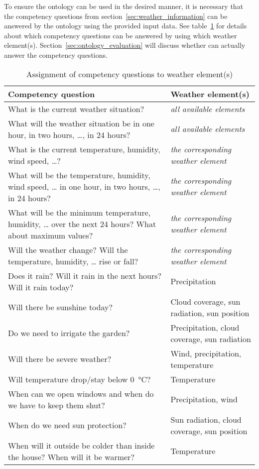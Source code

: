 To ensure the ontology can be used in the desired manner, it is necessary that the competency questions from section~\ref{sec:weather_information} can be answered by the ontology using the provided input data. See table~\ref{table:competency_questions} for details about which competency questions can be answered by using which weather element(s). Section~\ref{sec:ontology_evaluation} will discuss whether \thinkhomeweather can actually answer the competency questions.

\begin{table}
\begin{tabularx}{\textwidth}{|X|X|}
\hline
\textbf{Competency question} & \textbf{Weather element(s)} \\
\hline \hline
What is the current weather situation? & \emph{all available elements} \\
\hline
What will the weather situation be in one hour, in two hours, …, in 24 hours? & \emph{all available elements} \\
\hline
What is the current temperature, humidity, wind speed, …? & \emph{the corresponding weather element} \\
\hline
What will be the temperature, humidity, wind speed, … in one hour, in two hours, …, in 24 hours? & \emph{the corresponding weather element} \\
\hline
What will be the minimum temperature, humidity, … over the next 24 hours? What about maximum values? & \emph{the corresponding weather element} \\
\hline
Will the weather change? Will the temperature, humidity, … rise or fall? & \emph{the corresponding weather element} \\
\hline
Does it rain? Will it rain in the next hours? Will it rain today? & Precipitation \\
\hline
Will there be sunshine today? & Cloud coverage, sun radiation, sun position \\
\hline
Do we need to irrigate the garden? & Precipitation, cloud coverage, sun radiation \\
\hline
Will there be severe weather? & Wind, precipitation, temperature \\
\hline
Will temperature drop/stay below \SI{0}{\celsius}? & Temperature \\
\hline
When can we open windows and when do we have to keep them shut? & Precipitation, wind \\
\hline
When do we need sun protection? & Sun radiation, cloud coverage, sun position \\
\hline
When will it outside be colder than inside the house? When will it be warmer? & Temperature \\
\hline
\end{tabularx}
\label{table:competency_questions}
\caption{Assignment of competency questions to weather element(s)}
\end{table}

